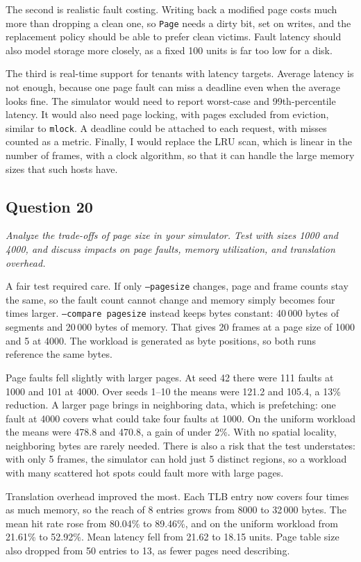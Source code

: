 \documentclass[11pt]{article}
\newcommand{\question}[2]{\subsection*{Question #1}\noindent\textit{#2}\par\medskip}
\newcommand{\code}[1]{\texttt{#1}}
\begin{document}
The second is realistic fault costing. Writing back a modified page costs much more
than dropping a clean one, so \code{Page} needs a dirty bit, set on writes, and the
replacement policy should be able to prefer clean victims. Fault latency should also
model storage more closely, as a fixed 100 units is far too low for a disk.

The third is real-time support for tenants with latency targets. Average latency is
not enough, because one page fault can miss a deadline even when the average looks
fine. The simulator would need to report worst-case and 99th-percentile latency. It
would also need page locking, with pages excluded from eviction, similar to
\code{mlock}. A deadline could be attached to each request, with misses counted
as a metric. Finally, I would replace the LRU scan, which is linear in the number of
frames, with a clock algorithm, so that it can handle the large memory sizes that
such hosts have.

\question{20}{Analyze the trade-offs of page size in your simulator. Test with sizes 1000 and 4000, and discuss impacts on page faults, memory utilization, and translation overhead.}
A fair test required care. If only \code{--pagesize} changes, page and frame counts
stay the same, so the fault count cannot change and memory simply becomes four times
larger. \code{--compare pagesize} instead keeps bytes constant: 40\,000 bytes of
segments and 20\,000 bytes of memory. That gives 20 frames at a page size of 1000 and
5 at 4000. The workload is generated as byte positions, so both runs reference the
same bytes.

Page faults fell slightly with larger pages. At seed 42 there were 111 faults at 1000
and 101 at 4000. Over seeds 1--10 the means were 121.2 and 105.4, a 13\% reduction.
A larger page brings in neighboring data, which is prefetching: one fault at 4000
covers what could take four faults at 1000. On the uniform workload the means were
478.8 and 470.8, a gain of under 2\%. With no spatial locality, neighboring bytes are
rarely needed. There is also a risk that the test understates: with only 5 frames, the
simulator can hold just 5 distinct regions, so a workload with many scattered hot
spots could fault more with large pages.

Translation overhead improved the most. Each TLB entry now covers four times as much
memory, so the reach of 8 entries grows from 8000 to 32\,000 bytes. The mean hit rate
rose from 80.04\% to 89.46\%, and on the uniform workload from 21.61\% to 52.92\%.
Mean latency fell from 21.62 to 18.15 units. Page table size also dropped from 50
entries to 13, as fewer pages need describing.
\end{document}
